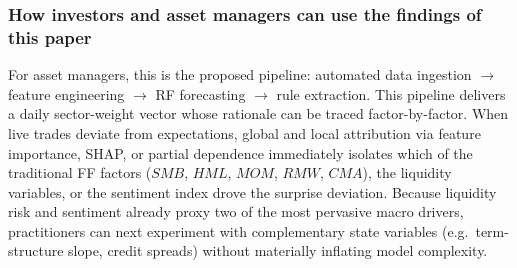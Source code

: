 \subsubsection{How investors and asset managers can use the findings of this paper}
For asset managers, this is the proposed pipeline: automated data ingestion $\rightarrow$ feature engineering $\rightarrow$ RF forecasting $\rightarrow$ rule extraction. This pipeline delivers a daily sector-weight vector whose rationale can be traced factor-by-factor. When live trades deviate from expectations, global and local attribution via feature importance, SHAP, or partial dependence immediately isolates which of the traditional FF factors ($SMB$, $HML$, $MOM$, $RMW$, $CMA$), the liquidity variables, or the sentiment index drove the surprise deviation. Because liquidity risk and sentiment already proxy two of the most pervasive macro drivers, practitioners can next experiment with complementary state variables (e.g.\ term-structure slope, credit spreads) without materially inflating model complexity.


